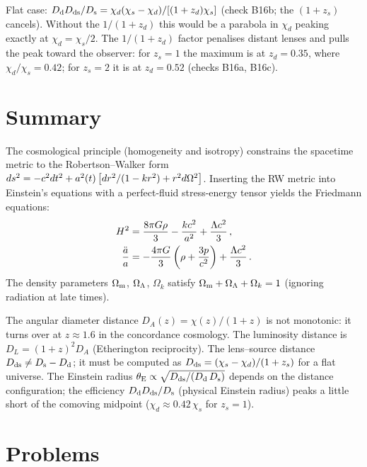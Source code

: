\begin{derivation}
Flat case: $D_{\mathrm{d}}D_{\mathrm{ds}}/D_{\mathrm{s}} = \chi_d(\chi_s-\chi_d)/[(1+z_d)\chi_s]$ (check B16b;
the $(1+z_s)$ cancels).  Without the $1/(1+z_d)$ this would be a parabola in
$\chi_d$ peaking exactly at $\chi_d = \chi_s/2$.  The $1/(1+z_d)$ factor
penalises distant lenses and pulls the peak toward the observer: for $z_s = 1$
the maximum is at $z_d = 0.35$, where $\chi_d/\chi_s = 0.42$; for $z_s = 2$ it
is at $z_d = 0.52$ (checks B16a, B16c).
\end{derivation}

\section{Summary}
\label{sec:cosmo_summary}

The cosmological principle (homogeneity and isotropy) constrains the
spacetime metric to the Robertson--Walker form
$ds^2 = -c^2 dt^2 + a^2(t)\left[dr^2/(1-kr^2)
+ r^2 d\Omega^2\right]$.  Inserting the RW metric into Einstein's
equations with a perfect-fluid stress-energy tensor yields the Friedmann
equations:
\begin{align*}
H^2 &= \frac{8\pi G\rho}{3}
- \frac{kc^2}{a^2}
+ \frac{\Lambda c^2}{3} \,, \\
\frac{\ddot{a}}{a} &= -\frac{4\pi G}{3}
\left(\rho + \frac{3p}{c^2}\right)
+ \frac{\Lambda c^2}{3} \,.
\end{align*}
The density parameters $\Omega_{\mathrm{m}}$, $\Omega_{\Lambda}$, $\Omega_k$ satisfy
$\Omega_{\mathrm{m}} + \Omega_{\Lambda} + \Omega_k = 1$ (ignoring radiation at late times).

The angular diameter distance $D_A(z) = \chi(z)/(1+z)$ is not monotonic:
it turns over at $z \approx 1.6$ in the concordance cosmology.  The
luminosity distance is $D_L = (1+z)^2 D_A$ (Etherington reciprocity).
The lens--source distance $D_{\mathrm{ds}} \neq D_{\mathrm{s}} - D_{\mathrm{d}}$; it must be computed as
$D_{\mathrm{ds}} = (\chi_s - \chi_d)/(1+z_s)$ for a flat universe.  The Einstein
radius $\theta_{\mathrm{E}} \propto
\sqrt{D_{\mathrm{ds}}/(D_{\mathrm{d}}\,D_{\mathrm{s}})}$ depends on the distance configuration; the
efficiency $D_{\mathrm{d}}D_{\mathrm{ds}}/D_{\mathrm{s}}$ (physical Einstein radius) peaks a little short
of the comoving midpoint ($\chi_d \approx 0.42\,\chi_s$ for $z_s = 1$).


\section{Problems}
\label{sec:cosmo_problems}

